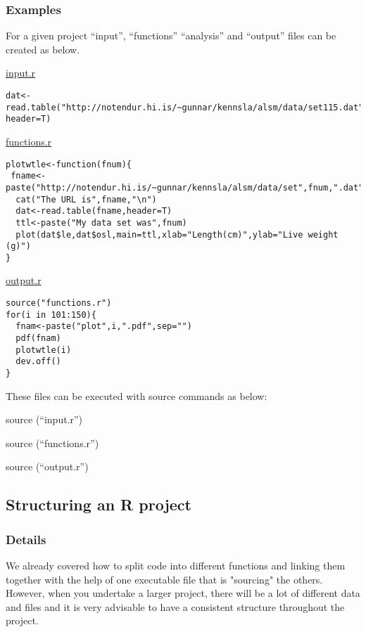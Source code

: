 \documentclass[12pt,a4paper]{article}
\theoremstyle{regla}
\theoremstyle{remark}
\theoremstyle{definition}
\theoremstyle{nonumberbreak}
\begin{document}
\subsubsection{Examples}
\begin{xmpl}
For a given project “input”, “functions” “analysis” and “output” files can be created as below. 

\underline{input.r}
\begin{lstlisting}
dat<-read.table("http://notendur.hi.is/~gunnar/kennsla/alsm/data/set115.dat", header=T)
\end{lstlisting}

\underline{functions.r}

\begin{lstlisting}
plotwtle<-function(fnum){
 fname<-paste("http://notendur.hi.is/~gunnar/kennsla/alsm/data/set",fnum,".dat",sep="")
  cat("The URL is",fname,"\n")
  dat<-read.table(fname,header=T)
  ttl<-paste("My data set was",fnum)
  plot(dat$le,dat$osl,main=ttl,xlab="Length(cm)",ylab="Live weight (g)")
}
\end{lstlisting}


\underline{output.r}
\begin{lstlisting}
source("functions.r")
for(i in 101:150){
  fnam<-paste("plot",i,".pdf",sep="")
  pdf(fnam)
  plotwtle(i)
  dev.off()
}
\end{lstlisting}

These files can be executed with source commands as below:
\begin{description}
\item source (“input.r”)
\item source (“functions.r”)
\item source (“output.r”)
\end{description}
		
\end{xmpl}


\subsection{Structuring an R project}
\subsubsection{Details}
We already covered how to split code into different functions and linking them together with the help of one executable file that is "sourcing" the others. 
However, when you undertake a larger project, there will be a lot of different data and files and it is very advisable to have a consistent structure 
throughout the project.\\ 
\end{document}
